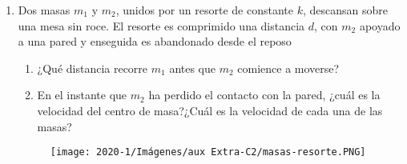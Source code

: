\documentclass[letterpaper,11pt]{article}
\begin{document}
\begin{enumerate}
\item Dos masas $m_1$ y $m_2$, unidos por un resorte de constante $k$, descansan sobre una mesa sin roce. El resorte es comprimido una distancia $d$, con $m_2$ apoyado a una pared y enseguida es abandonado desde el reposo
    \begin{enumerate}
        \item ¿Qué distancia recorre $m_1$ antes que $m_2$ comience a moverse?
        \item En el instante que $m_2$ ha perdido el contacto con la pared, ¿cuál es la velocidad del centro de masa?¿Cuál es la velocidad de cada una de las masas?
    \end{enumerate}
\begin{figure}[h!]
    \centering
    \texttt{[image: 2020-1/Imágenes/aux Extra-C2/masas-resorte.PNG]}
\end{figure}
\end{enumerate}
\end{document}
